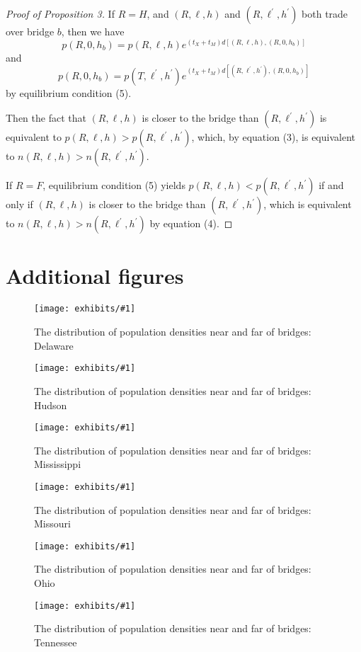 \documentclass[12pt]{article}
\newcommand{\dofigure}[2]{\begin{figure}[h!]
\center %
\texttt{[image: exhibits/\#1]}
\caption{#2\label{fig:#1}}
\end{figure}}
\begin{document}
\begin{proof}[Proof of Proposition 3]
If $R=H$, and $\left( R,\ell ,h\right) $ and $\left( R,\ell ^{\prime
},h^{\prime }\right) $ both trade over bridge $b$, then we have%
\begin{equation*}
p\left( R,0,h_{b}\right) =p\left( R,\ell ,h\right) e^{\left(
t_{X}+t_{M}\right) d\left[ \left( R,\ell ,h\right) ,\left( R,0,h_{b}\right) %
\right] }
\end{equation*}%
and%
\begin{equation*}
p\left( R,0,h_{b}\right) =p\left( T,\ell ^{\prime },h^{\prime }\right)
e^{\left( t_{X}+t_{M}\right) d\left[ \left( R,\ell ^{\prime },h^{\prime
}\right) ,\left( R,0,h_{b}\right) \right] }
\end{equation*}%
by equilibrium condition (5).

Then the fact that $\left( R,\ell ,h\right) $ is closer to the bridge than $%
\left( R,\ell ^{\prime },h^{\prime }\right) $ is equivalent to $p\left(
R,\ell ,h\right) >p\left( R,\ell ^{\prime },h^{\prime }\right) $, which, by
equation (3), is equivalent to $n\left( R,\ell ,h\right) >n\left( R,\ell
^{\prime },h^{\prime }\right) $.

If $R=F$, equilibrium condition (5) yields $p\left( R,\ell ,h\right)
<p\left( R,\ell ^{\prime },h^{\prime }\right) $ if and only if $\left(
R,\ell ,h\right) $ is closer to the bridge than $\left( R,\ell ^{\prime
},h^{\prime }\right) $, which is equivalent to $n\left( R,\ell ,h\right)
>n\left( R,\ell ^{\prime },h^{\prime }\right) $ by equation (4).
\end{proof}

\section{Additional figures}
\setcounter{figure}{0}
\renewcommand{\thefigure}{\thesection\arabic{figure}}

\dofigure{delaware_kernel}{The distribution of population densities near and far of bridges: Delaware}
\dofigure{hudson_kernel}{The distribution of population densities near and far of bridges: Hudson}
\dofigure{mississippi_kernel}{The distribution of population densities near and far of bridges: Mississippi}
\dofigure{missouri_kernel}{The distribution of population densities near and far of bridges: Missouri}
\dofigure{ohio_kernel}{The distribution of population densities near and far of bridges: Ohio}
\dofigure{tennessee_kernel}{The distribution of population densities near and far of bridges: Tennessee}
\end{document}
